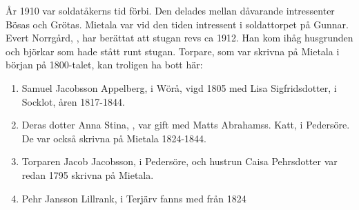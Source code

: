 År 1910 var soldatåkerns tid förbi. Den delades mellan dåvarande intressenter Bösas och Grötas. Mietala var vid den tiden intressent i soldattorpet på Gunnar. Evert Norrgård, , har berättat att stugan revs ca 1912. Han kom ihåg husgrunden och björkar som hade stått runt stugan. Torpare, som var skrivna på Mietala i början på 1800-talet, kan troligen ha bott här:
\begin{enumerate}
  \item Samuel Jacobsson Appelberg,  i Wörå, vigd 1805 med Lisa Sigfridsdotter,  i Socklot, åren 1817-1844.
  \item Deras dotter Anna Stina, , var gift med Matts Abrahamss. Katt,  i Pedersöre. De var också skrivna på Mietala 1824-1844.
  \item Torparen Jacob Jacobsson,  i Pedersöre, och hustrun Caisa Pehrsdotter var redan
  1795 skrivna på Mietala.
  \item Pehr Jansson Lillrank,  i Terjärv fanns med från 1824
\end{enumerate}

